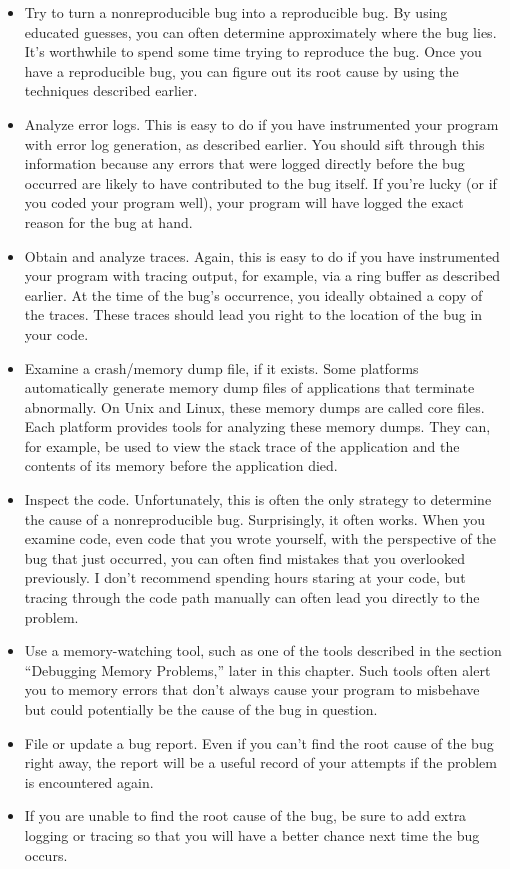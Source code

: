 \begin{itemize}
\item
Try to turn a nonreproducible bug into a reproducible bug. By using educated guesses, you can often determine approximately where the bug lies. It’s worthwhile to spend some time trying to reproduce the bug. Once you have a reproducible bug, you can figure out its root cause by using the techniques described earlier.

\item
Analyze error logs. This is easy to do if you have instrumented your program with error log generation, as described earlier. You should sift through this information because any errors that were logged directly before the bug occurred are likely to have contributed to the bug itself. If you’re lucky (or if you coded your program well), your program will have logged the exact reason for the bug at hand.

\item
Obtain and analyze traces. Again, this is easy to do if you have instrumented your program with tracing output, for example, via a ring buffer as described earlier. At the time of the bug’s occurrence, you ideally obtained a copy of the traces. These traces should lead you right to the location of the bug in your code.

\item
Examine a crash/memory dump file, if it exists. Some platforms automatically generate memory dump files of applications that terminate abnormally. On Unix and Linux, these memory dumps are called core files. Each platform provides tools for analyzing these memory dumps. They can, for example, be used to view the stack trace of the application and the contents of its memory before the application died.

\item
Inspect the code. Unfortunately, this is often the only strategy to determine the cause of a nonreproducible bug. Surprisingly, it often works. When you examine code, even code that you wrote yourself, with the perspective of the bug that just occurred, you can often find mistakes that you overlooked previously. I don’t recommend spending hours staring at your code, but tracing through the code path manually can often lead you directly to the problem.

\item
Use a memory-watching tool, such as one of the tools described in the section “Debugging Memory Problems,” later in this chapter. Such tools often alert you to memory errors that don’t always cause your program to misbehave but could potentially be the cause of the bug in question.

\item
File or update a bug report. Even if you can’t find the root cause of the bug right away, the report will be a useful record of your attempts if the problem is encountered again.

\item
If you are unable to find the root cause of the bug, be sure to add extra logging or tracing so that you will have a better chance next time the bug occurs.
\end{itemize}

